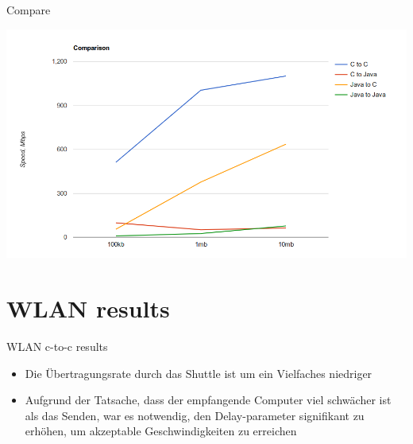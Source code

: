 \documentclass[10pt]{beamer}
\begin{document}
\begin{frame}[fragile]{Compare}

  \includegraphics[width=\linewidth]{plot.png}

\end{frame}

\section{WLAN results}

\begin{frame}[fragile]{WLAN c-to-c results}
  \begin{itemize}
  	\footnotesize 	
    \item{} Die Übertragungsrate durch das Shuttle ist um ein Vielfaches niedriger
    \item{} Aufgrund der Tatsache, dass der empfangende Computer viel schwächer ist als das Senden, war es notwendig, den Delay-parameter signifikant zu erhöhen, um akzeptable Geschwindigkeiten zu erreichen
  \end{itemize}
\end{frame}
\end{document}

